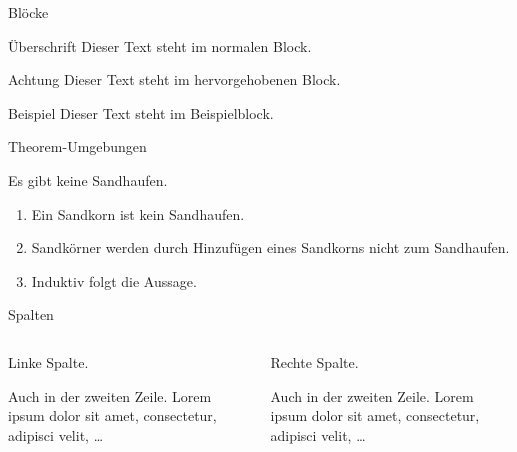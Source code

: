 \documentclass{beamer}
\begin{document}
  \begin{frame}{Blöcke}
    \begin{block}{Überschrift}
      Dieser Text steht im normalen Block.
    \end{block}

    \begin{alertblock}{Achtung}
      Dieser Text steht im hervorgehobenen Block.
    \end{alertblock}

    \begin{exampleblock}{Beispiel}
      Dieser Text steht im Beispielblock.
    \end{exampleblock}
  \end{frame}

  \begin{frame}{Theorem-Umgebungen}
    \begin{Satz}[Sandhaufensatz]
      Es gibt keine Sandhaufen.
    \end{Satz}

    \begin{Beweis}
      \begin{enumerate}
        \item Ein Sandkorn ist kein Sandhaufen.
        \item Sandkörner werden durch Hinzufügen
          eines Sandkorns nicht zum Sandhaufen.
        \item Induktiv folgt die Aussage. \qedhere
      \end{enumerate}
    \end{Beweis}
  \end{frame}

  \newcommand{\lorem}{\textcolor{black!40}{Auch in der zweiten Zeile. Lorem ipsum dolor sit amet, consectetur, adipisci velit, \ldots}}

  \begin{frame}{Spalten}
    \begin{columns}
      \begin{column}{5cm}
        Linke Spalte.

        \lorem
      \end{column}
      \begin{column}{5cm}
        Rechte Spalte.

        \lorem
      \end{column}
    \end{columns}
  \end{frame}
\end{document}
